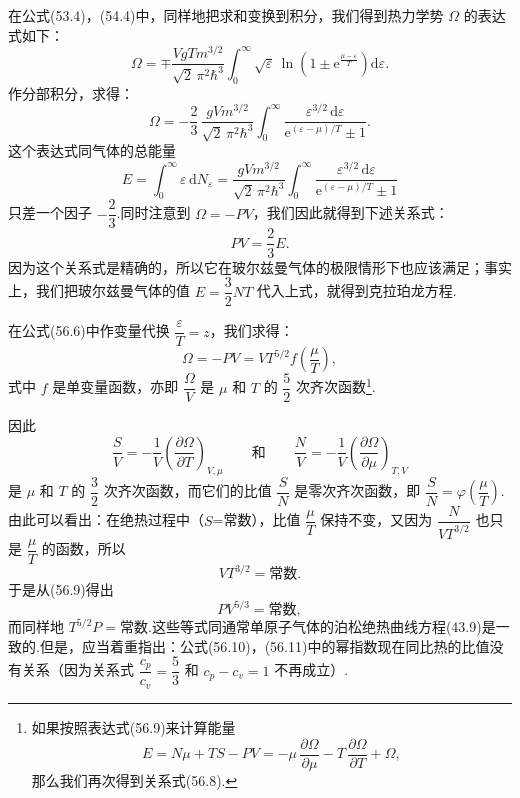 在公式(53.4)，(54.4)中，同样地把求和变换到积分，我们得到热力学势 $\Omega$ 的表达式如下：
\begin{equation*}
  \Omega=\mp\frac{VgTm^{3/2}}{\sqrt{2}\,\pi^2\hbar^3}\int_0^{\infty}
  \sqrt{\varepsilon}\,\ln\left(1\pm\mathrm{e}^{\frac{\mu-\varepsilon}{T}}\right)\mathrm{d}\varepsilon.
\end{equation*}
作分部积分，求得：
\begin{equation}
  \Omega=-\frac{2}{3}\,\frac{gVm^{3/2}}{\sqrt{2}\,\pi^2\hbar^3}
  \int_0^{\infty}\frac{\varepsilon^{3/2}\,\mathrm{d}\varepsilon}{\mathrm{e}^{(\varepsilon-\mu)/T}\pm1}.
\end{equation}
这个表达式同气体的总能量
\begin{equation}
  E=\int_0^{\infty}\varepsilon\,\mathrm{d}N_\varepsilon
  =\frac{gVm^{3/2}}{\sqrt{2}\,\pi^2\hbar^3}
  \int_0^{\infty}\frac{\varepsilon^{3/2}\,\mathrm{d}\varepsilon}{\mathrm{e}^{(\varepsilon-\mu)/T}\pm1}
\end{equation}
只差一个因子 $-\dfrac{2}{3}$.同时注意到 $\Omega=-PV$，我们因此就得到下述关系式：
\begin{equation}
  PV=\frac{2}{3}E.
\end{equation}
因为这个关系式是精确的，所以它在玻尔兹曼气体的极限情形下也应该满足；事实上，我们把玻尔兹曼气体的值 $E=\dfrac{3}{2}NT$ 代入上式，就得到克拉珀龙方程.

在公式(56.6)中作变量代换 $\dfrac{\varepsilon}{T}=z$，我们求得：
\begin{equation}
  \Omega=-PV=VT^{5/2}f\left(\frac{\mu}{T}\right),
\end{equation}
式中 $f$ 是单变量函数，亦即 $\dfrac{\Omega}{V}$ 是 $\mu$ 和 $T$ 的 $\dfrac{5}{2}$ 次齐次函数\footnote{如果按照表达式(56.9)来计算能量
\begin{equation*}
  E=N\mu+TS-PV=-\mu\,\frac{\partial\Omega}{\partial\mu}-T\,\frac{\partial\Omega}{\partial T}+\Omega,
\end{equation*}
那么我们再次得到关系式(56.8).}.

因此
\begin{equation*}
  \frac{S}{V}=-\frac{1}{V}\left(\frac{\partial\Omega}{\partial T}\right)_{V,\mu}
  \qquad\text{和}\qquad
  \frac{N}{V}=-\frac{1}{V}\left(\frac{\partial\Omega}{\partial\mu}\right)_{T,V}
\end{equation*}
是 $\mu$ 和 $T$ 的 $\dfrac{3}{2}$ 次齐次函数，而它们的比值 $\dfrac{S}{N}$ 是零次齐次函数，即 $\dfrac{S}{N}=\varphi\left(\dfrac{\mu}{T}\right)$.由此可以看出：在绝热过程中（$S$=常数），比值 $\dfrac{\mu}{T}$ 保持不变，又因为 $\dfrac{N}{VT^{3/2}}$ 也只是 $\dfrac{\mu}{T}$ 的函数，所以
\begin{equation}
  VT^{3/2}=\text{常数}.
\end{equation}
于是从(56.9)得出
\begin{equation}
  PV^{5/3}=\text{常数},
\end{equation}
而同样地 $T^{5/2}P=$常数.这些等式同通常单原子气体的泊松绝热曲线方程(43.9)是一致的.但是，应当着重指出：公式(56.10)，(56.11)中的幂指数现在同比热的比值没有关系（因为关系式 $\dfrac{c_p}{c_v}=\dfrac{5}{3}$ 和 $c_p-c_v=1$ 不再成立）.

